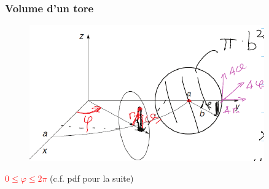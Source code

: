 \documentclass[12pt,a4paper]{article}
\begin{document}
\subsubsection{Volume d'un tore}
\begin{figure}[h!]
	\centering
	\includegraphics[scale=0.5]{images/tore}
\end{figure}
\textcolor{red}{$0\leq \varphi \leq 2\pi$} (c.f. pdf pour la suite)
\end{document}
